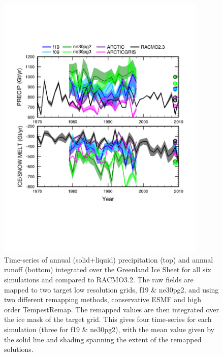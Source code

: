 \documentclass[draft]{agujournal2019}
\begin{document}
\begin{figure}[t]
\begin{center}
         \includegraphics[width=100mm]{figs/temp_tseries_GRIS.pdf}
\end{center}
\caption{Time-series of annual (solid+liquid) precipitation (top) and annual runoff (bottom) integrated over the Greenland Ice Sheet for all six simulations and compared to RACMO3.2. The raw fields are mapped to two target low resolution grids, f19 \& ne30pg2, and using two different remapping methods, conservative ESMF and high order TempestRemap. The remapped values are then integrated over the ice mask of the target grid. This gives four time-series for each simulation (three for f19 \& ne30pg2), with the mean value given by the solid line and shading spanning the extent of the remapped solutions.}
\label{fig:tseries}
\end{figure}
\end{document}
